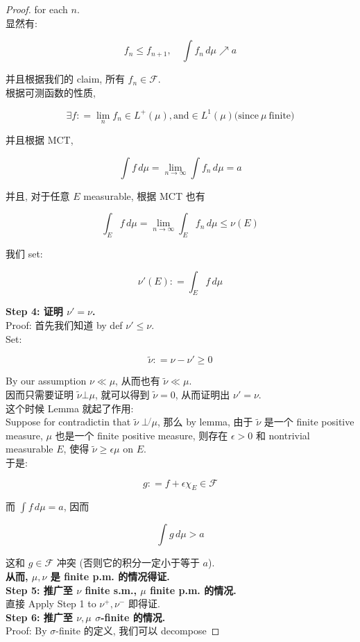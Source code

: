 \documentclass{qlnotes-export}
\begin{document}
\begin{proof}
for each \(n\).\\
显然有:

\[f_{n} \leq f_{n + 1},\quad\int f_{n}\, d\mu\operatorname{\nearrow ︎}a\]

并且根据我们的 claim, 所有 \(f_{n} \in \mathcal{F}\).\\
根据可测函数的性质,

\[\exists f: = \lim\limits_{n}f_{n} \in L^{+}(\mu),\text{and} \in L^{1}(\mu)\text{(since}\ \mu\ \text{finite)}\]

并且根据 MCT,

\[\int f\, d\mu = \lim\limits_{n\rightarrow\infty}\int f_{n}\, d\mu = a\]

并且, 对于任意 \(E\) measurable, 根据 MCT 也有

\[\int_{E}f\, d\mu = \lim\limits_{n\rightarrow\infty}\int_{E}f_{n}\, d\mu \leq \nu(E)\]

我们 set:

\[\nu'(E): = \int_{E}f\, d\mu\]

\textbf{Step 4: 证明 \(\nu' = \nu\).}\\
Proof: 首先我们知道 by def \(\nu' \leq \nu\).\\
Set:

\[\widetilde{\nu}: = \nu - \nu' \geq 0\]

By our assumption \(\nu \ll \mu\), 从而也有 \(\widetilde{\nu} \ll \mu\).\\
因而只需要证明 \(\widetilde{\nu}\bot\mu\), 就可以得到 \(\widetilde{\nu} = 0\), 从而证明出 \(\nu' = \nu\).\\
这个时候 Lemma 就起了作用:\\
Suppose for contradictin that \(\widetilde{\nu}\operatorname{\perp\not{}}\mu\), 那么 by lemma, 由于 \(\widetilde{\nu}\) 是一个 finite positive measure, \(\mu\) 也是一个 finite positive measure, 则存在 \(\epsilon > 0\) 和 nontrivial measurable \(E\), 使得 \(\widetilde{\nu} \geq \epsilon\mu\) on \(E\).\\
于是:

\[g: = f + \epsilon\chi_{E} \in \mathcal{F}\]

而 \(\int f\, d\mu = a\), 因而

\[\int g\, d\mu > a\]

这和 \(g \in \mathcal{F}\) 冲突 (否则它的积分一定小于等于 \(a\)).\\
\textbf{从而, \(\mu,\nu\) 是 finite p.m. 的情况得证.}\\
\textbf{Step 5: 推广至 \(\nu\) finite s.m., \(\mu\) finite p.m. 的情况.}\\
直接 Apply Step 1 to \(\nu^{+},\nu^{-}\) 即得证.\\
\textbf{Step 6: 推广至 \(\nu,\mu\) \(\sigma\)-finite 的情况.}\\
Proof: By \(\sigma\)-finite 的定义, 我们可以 decompose


\end{proof}
\end{document}
